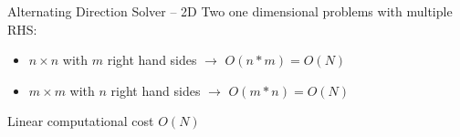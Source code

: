 \documentclass[c]{beamer}
\newcommand{\inblue}[1]{\textcolor{blue}{#1}}
\newcommand{\Mat}[1]{\mathbf{#1}}
\begin{document}
\begin{frame}[fragile]{Alternating Direction Solver -- 2D}
Two one dimensional problems with multiple RHS:
\begin{itemize}
\item $ n \times n $ with $m$ right hand sides $\rightarrow$ $O(n*m)=O(N)$
\item $ m \times m $ with $n$ right hand sides $\rightarrow$ $O(m*n)=O(N)$
\end{itemize}
Linear computational cost $O(N)$

\end{frame}



%
%
%
%
%
\end{document}
